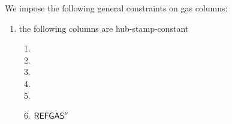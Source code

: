 We impose the following general constraints on gas columns:
\begin{enumerate}
        \item the following columns are hub-stamp-constant
		\begin{multicols}{3}
			\begin{enumerate}
				\item \gasExpected
				\item \gasNext
				\item \gasActual
				\item \gasCost
				\item {}
				\item $\textsf{REFGAS}^{\nu}$
			\end{enumerate}
		\end{multicols}
\end{enumerate}
